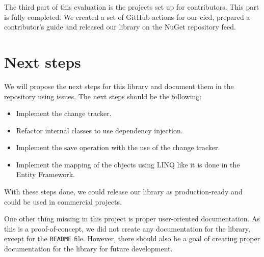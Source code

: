 The third part of this evaluation is the projects set up for contributors.
This part is fully completed. We created a set of GitHub actions for our \acrshort{cicd}, prepared a contributor's guide and released our library on the NuGet repository feed.

\section{Next steps}

We will propose the next steps for this library and document them in the repository using issues. The next steps should be the following:
\begin{itemize}
    \item {Implement the change tracker.}
    \item {Refactor internal classes to use dependency injection.}
    \item {Implement the save operation with the use of the change tracker.}
    \item {Implement the mapping of the objects using LINQ like it is done in the Entity Framework.}
\end{itemize}
With these steps done, we could release our library as production-ready and could be used in commercial projects.

One other thing missing in this project is proper user-oriented documentation.
As this is a proof-of-concept, we did not create any documentation for the library, except for the \texttt{README} file.
However, there should also be a goal of creating proper documentation for the library for future development.
